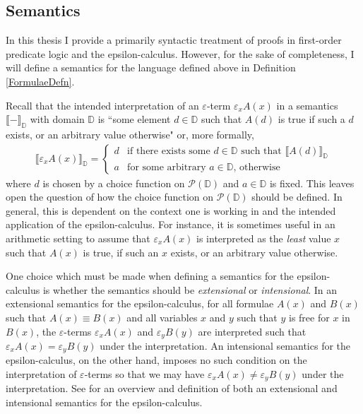 \documentclass[10pt]{article}
\theoremstyle{definition}\newtheorem{remark}[theorem]{Remark}
\theoremstyle{definition}\newtheorem{example}[theorem]{Example}
\theoremstyle{definition}\newtheorem{definition}[theorem]{Definition}
\begin{document}
	\subsection{Semantics}\label{SemanticsSection}
	
	In this thesis I provide a primarily syntactic treatment of proofs in first-order predicate logic and the epsilon-calculus. However, for the sake of completeness, I will define a semantics for the language defined above in Definition \ref{FormulaeDefn}.
	
	Recall that the intended interpretation of an $\varepsilon$-term $\varepsilon_x A(x)$ in a semantics $\llbracket - \rrbracket_\mathbb{D}$ with domain $\mathbb{D}$ is ``some element $d \in \mathbb{D}$ such that $A(d)$ is true if such a $d$ exists, or an arbitrary value otherwise" or, more formally,
	\begin{gather}\label{EpsilonSemanticsInformalDef}
		\llbracket \varepsilon_x A(x) \rrbracket_{\mathbb{D}} = \begin{cases}
			d & \text{if there exists some $d \in \mathbb{D}$ such that $\llbracket A(d) \rrbracket_\mathbb{D}$} \\
			a & \text{for some arbitrary $a \in \mathbb{D}$, otherwise}
		\end{cases}
	\end{gather}
	where $d$ is chosen by a choice function on $\mathcal{P}(\mathbb{D})$ and $a \in \mathbb{D}$ is fixed. This leaves open the question of how the choice function on $\mathcal{P}(\mathbb{D})$ should be defined. In general, this is dependent on the context one is working in and the intended application of the epsilon-calculus. For instance, it is sometimes useful in an arithmetic setting to assume that $\varepsilon_x A(x)$ is interpreted as the \textit{least} value $x$ such that $A(x)$ is true, if such an $x$ exists, or an arbitrary value otherwise.
	
	One choice which must be made when defining a semantics for the epsilon-calculus is whether the semantics should be \textit{extensional} or \textit{intensional}. In an extensional semantics for the epsilon-calculus, for all formulae $A(x)$ and $B(x)$ such that $A(x) \equiv B(x)$ and all variables $x$ and $y$ such that $y$ is free for $x$ in $B(x)$, the $\varepsilon$-terms $\varepsilon_x A(x)$ and $\varepsilon_y B(y)$ are interpreted such that $\varepsilon_xA(x) = \varepsilon_y B(y)$ under the interpretation. An intensional semantics for the epsilon-calculus, on the other hand, imposes no such condition on the interpretation of $\varepsilon$-terms so that we may have $\varepsilon_x A(x) \neq \varepsilon_y B(y)$ under the interpretation. See \cite{ZachEpsilonSemantics} for an overview and definition of both an extensional and intensional semantics for the epsilon-calculus.
	
\end{document}
